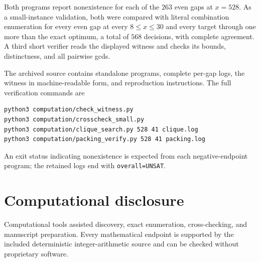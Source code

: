 \documentclass[11pt]{article}
\begin{document}
Both programs report nonexistence for each of the $263$ even gaps at $x=528$.
As a small-instance validation, both were compared with literal combination
enumeration for every even gap at every $8\le x\le30$ and every target through
one more than the exact optimum, a total of $568$ decisions, with complete
agreement.  A third short verifier reads the displayed witness and checks its
bounds, distinctness, and all pairwise gcds.

The archived source contains standalone programs, complete per-gap logs, the
witness in machine-readable form, and reproduction instructions.  The full
verification commands are
\begin{verbatim}
python3 computation/check_witness.py
python3 computation/crosscheck_small.py
python3 computation/clique_search.py 528 41 clique.log
python3 computation/packing_verify.py 528 41 packing.log
\end{verbatim}
An exit status indicating nonexistence is expected from each negative-endpoint
program; the retained logs end with \texttt{overall=UNSAT}.
\section*{Computational disclosure}
Computational tools assisted discovery, exact enumeration, cross-checking,
and manuscript preparation.  Every mathematical endpoint is supported by
the included deterministic integer-arithmetic source and can be checked
without proprietary software.


\end{document}
